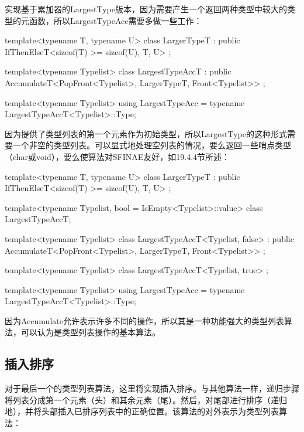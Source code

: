 实现基于累加器的LargestType版本，因为需要产生一个返回两种类型中较大的类型的元函数，所以LargestTypeAcc需要多做一些工作：

\begin{cpp}
template<typename T, typename U>
class LargerTypeT
: public IfThenElseT<sizeof(T) >= sizeof(U), T, U> {};

template<typename Typelist>
class LargestTypeAccT
: public AccumulateT<PopFront<Typelist>, LargerTypeT,
Front<Typelist>> {};

template<typename Typelist>
using LargestTypeAcc = typename LargestTypeAccT<Typelist>::Type;
\end{cpp}

因为提供了类型列表的第一个元素作为初始类型，所以LargestType的这种形式需要一个非空的类型列表。可以显式地处理空列表的情况，要么返回一些哨点类型（char或void），要么使算法对SFINAE友好，如19.4.4节所述：

\begin{cpp}
template<typename T, typename U>
class LargerTypeT
: public IfThenElseT<sizeof(T) >= sizeof(U), T, U> {};

template<typename Typelist, bool = IsEmpty<Typelist>::value>
class LargestTypeAccT;

template<typename Typelist>
class LargestTypeAccT<Typelist, false>
: public AccumulateT<PopFront<Typelist>, LargerTypeT,
					Front<Typelist>> {};

template<typename Typelist>
class LargestTypeAccT<Typelist, true> {};

template<typename Typelist>
using LargestTypeAcc = typename LargestTypeAccT<Typelist>::Type;
\end{cpp}

因为Accumulate允许表示许多不同的操作，所以其是一种功能强大的类型列表算法，可以认为是类型列表操作的基本算法。

\subsection{插入排序}

对于最后一个的类型列表算法，这里将实现插入排序。与其他算法一样，递归步骤将列表分成第一个元素（头）和其余元素（尾）。然后，对尾部进行排序（递归地），并将头部插入已排序列表中的正确位置。该算法的对外表示为类型列表算法：

